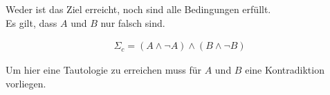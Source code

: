 Weder ist das Ziel erreicht, noch sind alle Bedingungen erfüllt. \\


Es gilt, dass $A$ und $B$ nur falsch sind.

\begin{eqnarray}
	\Sigma_{c} = \left( A \land \lnot A \right) \land \left( B \land \lnot B \right)
\end{eqnarray}

Um hier eine Tautologie zu erreichen muss für $A$ und $B$ eine Kontradiktion vorliegen.